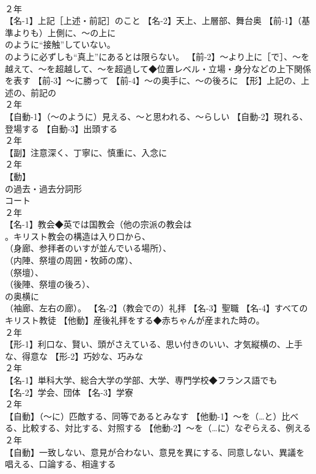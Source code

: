 \documentclass[8pt]{extreport}
\begin{document}
\begin{CJK}{UTF8}{min}
\\	２年	
\\	【名-1】上記［上述・前記］のこと 【名-2】天上、上層部、舞台奥 【前-1】（基準よりも）上側に、～の上に
\\	のように“接触”していない。
\\	のように必ずしも“真上”にあるとは限らない。 【前-2】～より上に［で］、～を越えて、～を超越して、～を超過して◆位置レベル・立場・身分などの上下関係を表す 【前-3】～に勝って 【前-4】～の奥手に、～の後ろに 【形】上記の、上述の、前記の
\\	２年	
\\	【自動-1】（～のように）見える、～と思われる、～らしい 【自動-2】現れる、登場する 【自動-3】出頭する
\\	２年	
\\	【副】注意深く、丁寧に、慎重に、入念に
\\	２年	
\\	【動】
\\	の過去・過去分詞形 
\\	コート
\\	２年	
\\	【名-1】教会◆英では国教会（他の宗派の教会は 
\\	。キリスト教会の構造は入り口から、
\\	（身廊、参拝者のいすが並んでいる場所）、
\\	（内陣、祭壇の周囲・牧師の席）、
\\	（祭壇）、
\\	（後陣、祭壇の後ろ）、
\\	の奥横に 
\\	（袖廊、左右の廊）。 【名-2】（教会での）礼拝 【名-3】聖職 【名-4】すべてのキリスト教徒 【他動】産後礼拝をする◆赤ちゃんが産まれた時の。
\\	２年	
\\	【形-1】利口な、賢い、頭がさえている、思い付きのいい、才気縦横の、上手な、得意な 【形-2】巧妙な、巧みな
\\	２年	
\\	【名-1】単科大学、総合大学の学部、大学、専門学校◆フランス語でも 
\\	【名-2】学会、団体 【名-3】学寮
\\	２年	
\\	【自動】（～に）匹敵する、同等であるとみなす 【他動-1】～を（…と）比べる、比較する、対比する、対照する 【他動-2】～を（…に）なぞらえる、例える
\\	２年	
\\	【自動】一致しない、意見が合わない、意見を異にする、同意しない、異議を唱える、口論する、相違する

\end{CJK}
\end{document}
